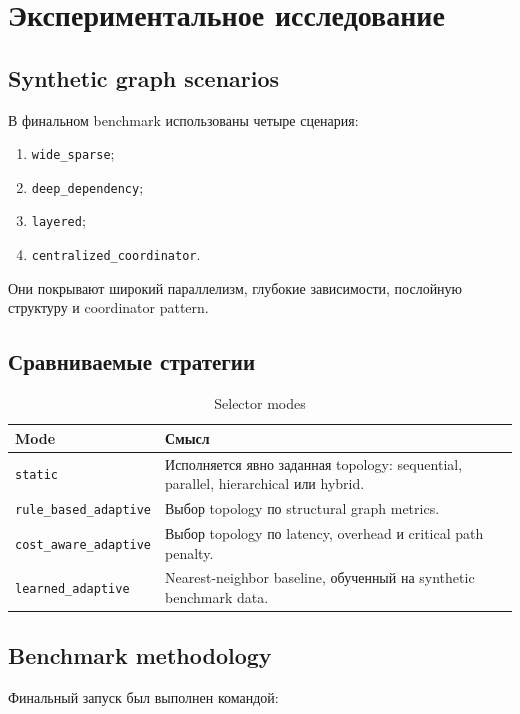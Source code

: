 \documentclass[12pt,a4paper]{report}
\newcommand{\code}[1]{\texttt{#1}}
\begin{document}
\chapter{Экспериментальное исследование}

\section{Synthetic graph scenarios}

В финальном benchmark использованы четыре сценария:

\begin{enumerate}
  \item \code{wide\_sparse};
  \item \code{deep\_dependency};
  \item \code{layered};
  \item \code{centralized\_coordinator}.
\end{enumerate}

Они покрывают широкий параллелизм, глубокие зависимости, послойную структуру и coordinator pattern.

\section{Сравниваемые стратегии}

\begin{table}[h]
\centering
\caption{Selector modes}
\begin{tabular}{p{}p{}}
\toprule
Mode & Смысл \\
\midrule
\code{static} & Исполняется явно заданная topology: sequential, parallel, hierarchical или hybrid. \\
\code{rule\_based\_adaptive} & Выбор topology по structural graph metrics. \\
\code{cost\_aware\_adaptive} & Выбор topology по latency, overhead и critical path penalty. \\
\code{learned\_adaptive} & Nearest-neighbor baseline, обученный на synthetic benchmark data. \\
\bottomrule
\end{tabular}
\end{table}

\section{Benchmark methodology}

Финальный запуск был выполнен командой:
\end{document}
